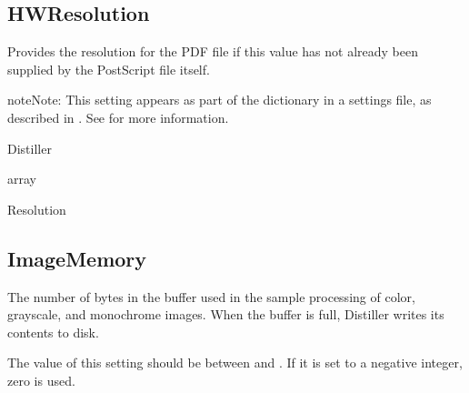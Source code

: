 \documentclass[letterpaper,12pt,english,openany,oneside]{sphinxmanual}
\begin{document}
\subsection{HWResolution}
\label{\detokenize{PDF_Create_CommonSettings:hwresolution}}
Provides the resolution for the PDF file if this value has not already been supplied by the PostScript file itself.

\begin{sphinxadmonition}{note}{Note:}
This setting appears as part of the  dictionary in a settings file, as described in . See  for more information.
\end{sphinxadmonition}
\label{\detokenize{PDF_Create_CommonSettings:supported-by-10}}

Distiller

\label{\detokenize{PDF_Create_CommonSettings:type-10}}

array

\label{\detokenize{PDF_Create_CommonSettings:ui-name-9}}

Resolution

\label{\detokenize{PDF_Create_CommonSettings:default-value-9}}

\begin{sphinxVerbatim}[commandchars=\\\{\}]
\PYG{p}{[} \PYG{p}{]}
\end{sphinxVerbatim}


\subsection{ImageMemory}
\label{\detokenize{PDF_Create_CommonSettings:imagememory}}
The number of bytes in the buffer used in the sample processing of color, grayscale, and monochrome images. When the buffer is full, Distiller writes its contents to disk.

The value of this setting should be between  and  . If it is set to a negative integer, zero is used.

\label{\detokenize{PDF_Create_CommonSettings:supported-by-11}}
\end{document}
